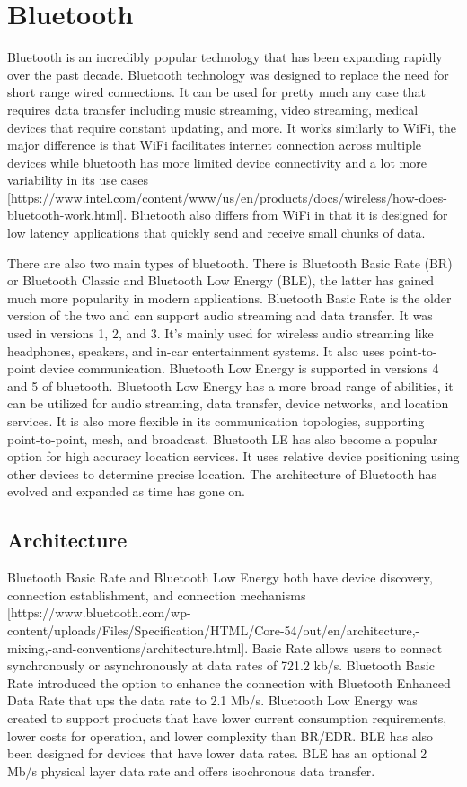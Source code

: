 \chapter{Bluetooth}\label{text}
Bluetooth is an incredibly popular technology that has been expanding rapidly over the past decade. 
Bluetooth technology was designed to replace the need for short range wired connections. 
It can be used for pretty much any case that requires data transfer including music streaming, video streaming, medical devices that require constant updating, and more. 
It works similarly to WiFi, the major difference is that WiFi facilitates internet connection across multiple devices while bluetooth has more limited device connectivity and a lot more variability in its use cases [https://www.intel.com/content/www/us/en/products/docs/wireless/how-does-bluetooth-work.html]. 
Bluetooth also differs from WiFi in that it is designed for low latency applications that quickly send and receive small chunks of data. 

There are also two main types of bluetooth. 
There is Bluetooth Basic Rate (BR) or Bluetooth Classic and Bluetooth Low Energy (BLE), the latter has gained much more popularity in modern applications. 
Bluetooth Basic Rate is the older version of the two and can support audio streaming and data transfer. 
It was used in versions 1, 2, and 3. It’s mainly used for wireless audio streaming like headphones, speakers, and in-car entertainment systems. 
It also uses point-to-point device communication. 
Bluetooth Low Energy is supported in versions 4 and 5 of bluetooth. 
Bluetooth Low Energy has a more broad range of abilities, it can be utilized for audio streaming, data transfer, device networks, and location services. 
It is also more flexible in its communication topologies, supporting point-to-point, mesh, and broadcast. Bluetooth LE has also become a popular option for high accuracy location services. 
It uses relative device positioning using other devices to determine precise location. 
The architecture of Bluetooth has evolved and expanded as time has gone on.

\section{Architecture}
Bluetooth Basic Rate and Bluetooth Low Energy both have device discovery, connection establishment, and connection mechanisms [https://www.bluetooth.com/wp-content/uploads/Files/Specification/HTML/Core-54/out/en/architecture,-mixing,-and-conventions/architecture.html].  
Basic Rate allows users to connect synchronously or asynchronously at data rates of 721.2 kb/s. 
Bluetooth Basic Rate introduced the option to enhance the connection with Bluetooth Enhanced Data Rate that ups the data rate to 2.1 Mb/s. 
Bluetooth Low Energy was created to support products that have lower current consumption requirements, lower costs for operation, and lower complexity than BR/EDR. 
BLE has also been designed for devices that have lower data rates. 
BLE has an optional 2 Mb/s physical layer data rate and offers isochronous data transfer. 

